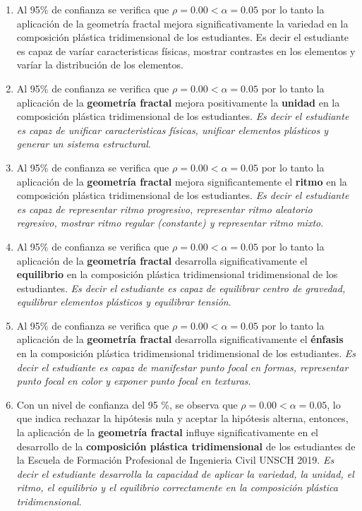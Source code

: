 \documentclass[12pt,]{report}
\begin{document}
\begin{enumerate}
\def\labelenumi{\arabic{enumi}.}
\item
  Al 95\% de confianza se verifica que \(\rho=0.00<\alpha=0.05\) por lo tanto la aplicación
  de la geometría fractal mejora significativamente la variedad en la composición
  plástica tridimensional de los estudiantes. Es decir el estudiante es capaz de varíar
  caracteristicas físicas, mostrar contrastes en los elementos y varíar la distribución
  de los elementos.
\item
  Al 95\% de confianza se verifica que \(\rho=0.00<\alpha=0.05\) por lo tanto la aplicación de la
  \textbf{geometría fractal} mejora positivamente la \textbf{unidad} en la composición
  plástica tridimensional de los estudiantes. \emph{Es decir el estudiante es capaz de unificar caracteristicas
  físicas, unificar elementos plásticos y generar un sistema estructural}.
\item
  Al 95\% de confianza se verifica que \(\rho=0.00<\alpha=0.05\) por lo tanto la aplicación
  de la \textbf{geometría fractal} mejora significantemente el \textbf{ritmo} en la composición plástica
  tridimensional de los estudiantes. \emph{Es decir el estudiante es capaz de representar ritmo progresivo,
  representar ritmo aleatorio regresivo, mostrar ritmo regular (constante) y representar
  ritmo mixto}.
\item
  Al 95\% de confianza se verifica que \(\rho=0.00<\alpha=0.05\) por lo tanto la aplicación de
  la \textbf{geometría fractal} desarrolla significativamente el \textbf{equilibrio} en la composición plástica
  tridimensional tridimensional de los estudiantes. \emph{Es decir el estudiante es capaz de equilibrar
  centro de gravedad, equilibrar elementos plásticos y equilibrar tensión}.
\item
  Al 95\% de confianza se verifica que \(\rho=0.00<\alpha=0.05\) por lo tanto la aplicación de la
  \textbf{geometría fractal} desarrolla significativamente el \textbf{énfasis} en la composición plástica tridimensional
  tridimensional de los estudiantes. \emph{Es decir el estudiante es capaz de manifestar punto
  focal en formas, representar punto focal en color y exponer punto focal en texturas}.
\item
  Con un nivel de confianza del 95 \%, se observa que \(\rho=0.00<\alpha=0.05\), lo que indica
  rechazar la hipótesis nula y aceptar la hipótesis alterna, entonces, la aplicación de la
  \textbf{geometría fractal} influye significativamente en el desarrollo de la \textbf{composición plástica
  tridimensional} de los estudiantes de la Escuela de Formación Profesional de Ingenieria
  Civil UNSCH 2019. \emph{Es decir el estudiante desarrolla la capacidad de aplicar la variedad,
  la unidad, el ritmo, el equilibrio y el equilibrio correctamente en la composición
  plástica tridimensional}.
\end{enumerate}
\end{document}
